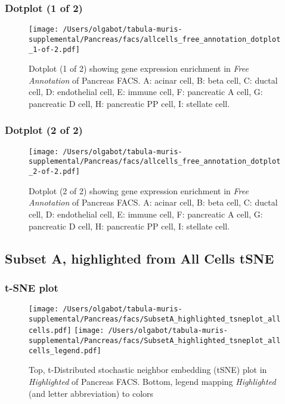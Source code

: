 \subsubsection{Dotplot (1 of 2)}
\begin{figure}[h]
\centering
\texttt{[image: /Users/olgabot/tabula-muris-supplemental/Pancreas/facs/allcells\_free\_annotation\_dotplot\_1-of-2.pdf]}

\caption{ Dotplot (1 of 2)  showing gene expression enrichment in \emph{Free Annotation} of Pancreas FACS. A: acinar cell, B: beta cell, C: ductal cell, D: endothelial cell, E: immune cell, F: pancreatic A cell, G: pancreatic D cell, H: pancreatic PP cell, I: stellate cell.}
\end{figure}


\clearpage

\subsubsection{Dotplot (2 of 2)}
\begin{figure}[h]
\centering
\texttt{[image: /Users/olgabot/tabula-muris-supplemental/Pancreas/facs/allcells\_free\_annotation\_dotplot\_2-of-2.pdf]}

\caption{ Dotplot (2 of 2)  showing gene expression enrichment in \emph{Free Annotation} of Pancreas FACS. A: acinar cell, B: beta cell, C: ductal cell, D: endothelial cell, E: immune cell, F: pancreatic A cell, G: pancreatic D cell, H: pancreatic PP cell, I: stellate cell.}
\end{figure}


\clearpage
\subsection{Subset A, highlighted from All Cells tSNE}
\subsubsection{t-SNE plot}
\begin{figure}[h]
\centering
\texttt{[image: /Users/olgabot/tabula-muris-supplemental/Pancreas/facs/SubsetA\_highlighted\_tsneplot\_allcells.pdf]}
\texttt{[image: /Users/olgabot/tabula-muris-supplemental/Pancreas/facs/SubsetA\_highlighted\_tsneplot\_allcells\_legend.pdf]}
\caption{Top, t-Distributed stochastic neighbor embedding (tSNE) plot  in \emph{Highlighted} of Pancreas FACS. Bottom, legend mapping \emph{Highlighted} (and letter abbreviation) to colors}
\end{figure}


